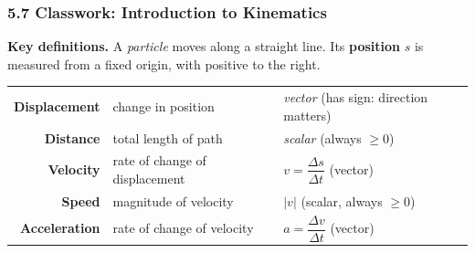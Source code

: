 \documentclass[12pt, twoside]{article}
\begin{document}
\subsubsection*{5.7 Classwork: Introduction to Kinematics}

\textbf{Key definitions.}
A \emph{particle} moves along a straight line.
Its \textbf{position} $s$ is measured from a fixed origin, with positive to the right.

\smallskip
\begin{tabular}{r@{\;---\;}l@{\qquad}l}
  \textbf{Displacement} & change in position & \emph{vector} (has sign: direction matters) \\
  \textbf{Distance}     & total length of path & \emph{scalar} (always $\geq 0$) \\
  \textbf{Velocity}     & rate of change of displacement &
    $v = \dfrac{\Delta s}{\Delta t}$ \;(vector) \\[4pt]
  \textbf{Speed}        & magnitude of velocity & $|v|$ \;(scalar, always $\geq 0$) \\
  \textbf{Acceleration} & rate of change of velocity &
    $a = \dfrac{\Delta v}{\Delta t}$ \;(vector)
\end{tabular}

\medskip
\end{document}
